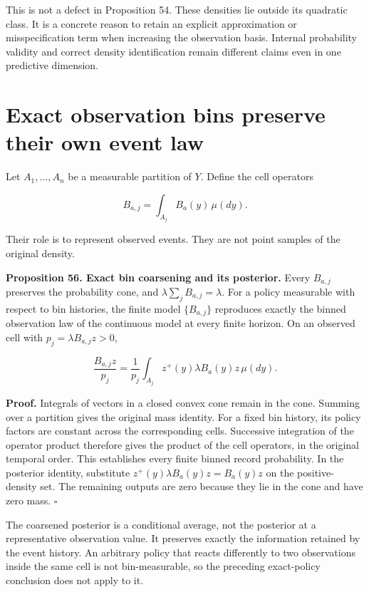 This is not a defect in Proposition 54. These densities lie outside its
quadratic class. It is a concrete reason to retain an explicit
approximation or misspecification term when increasing the observation
basis. Internal probability validity and correct density identification
remain different claims even in one predictive dimension.

\section{Exact observation bins preserve their own event law}\label{LSM:exact-observation-bins-preserve-their-own-event-law}

Let \(A_1,\ldots,A_n\) be a measurable partition of \(Y\). Define the
cell operators

\[
B_{a,j}=\int_{A_j}B_a(y)\,\mu(dy).
\]

Their role is to represent observed events. They are not point samples
of the original density.

\textbf{Proposition 56. Exact bin coarsening and its posterior.} Every
\(B_{a,j}\) preserves the probability cone, and
\(\lambda\sum_jB_{a,j}=\lambda\). For a policy measurable with respect
to bin histories, the finite model \(\{B_{a,j}\}\) reproduces exactly
the binned observation law of the continuous model at every finite
horizon. On an observed cell with \(p_j=\lambda B_{a,j}z>0\),

\[
\frac{B_{a,j}z}{p_j}
=\frac1{p_j}\int_{A_j}z^+(y)\lambda B_a(y)z\,\mu(dy).
\]

\textbf{Proof.} Integrals of vectors in a closed convex cone remain in
the cone. Summing over a partition gives the original mass identity. For
a fixed bin history, its policy factors are constant across the
corresponding cells. Successive integration of the operator product
therefore gives the product of the cell operators, in the original
temporal order. This establishes every finite binned record probability.
In the posterior identity, substitute \(z^+(y)\lambda B_a(y)z=B_a(y)z\)
on the positive-density set. The remaining outputs are zero because they
lie in the cone and have zero mass. \(\square\)

The coarsened posterior is a conditional average, not the posterior at a
representative observation value. It preserves exactly the information
retained by the event history. An arbitrary policy that reacts
differently to two observations inside the same cell is not
bin-measurable, so the preceding exact-policy conclusion does not apply
to it.

